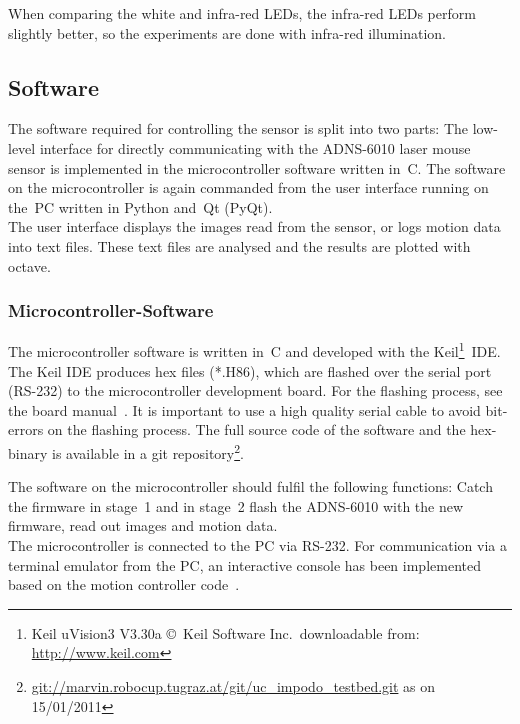 \documentclass[12pt,a4paper]{article}
\begin{document}
When comparing the white and infra-red LEDs, the infra-red LEDs perform slightly better, so the experiments are done with infra-red illumination.


\subsection{Software}
\label{software}

The software required for controlling the sensor is split into two parts: 
The low-level interface for directly communicating with the ADNS-6010 laser mouse sensor is implemented in the microcontroller software written in~C.
The software on the microcontroller is again commanded from the user interface running on the~PC written in Python and~Qt (PyQt).\\
The user interface displays the images read from the sensor, or logs motion data into text files.
These text files are analysed and the results are plotted with octave.

\subsubsection{Microcontroller-Software}

The microcontroller software is written in~C and developed with the Keil\footnote{Keil uVision3 V3.30a \copyright~Keil Software Inc.\ downloadable from: \url{http://www.keil.com}}~IDE. %
The Keil IDE produces hex files (*.H86), which are flashed over the serial port (RS-232) to the microcontroller development board.
For the flashing process, see the board manual~\cite{xc}.
It is important to use a high quality serial cable to avoid bit-errors on the flashing process.
The full source code of the software and the hex-binary is available in a git repository\footnote{\url{git://marvin.robocup.tugraz.at/git/uc_impodo_testbed.git} as on 15/01/2011}.

The  software on the microcontroller should fulfil the following functions:
Catch the firmware in stage~1
and in stage~2 flash the ADNS-6010 with the new firmware, 
read out images and motion data.\\
The microcontroller is connected to the PC via RS-232.
For communication via a terminal emulator from the PC, an interactive console has been implemented based on the motion controller code~\cite{krammer07}.
\end{document}
